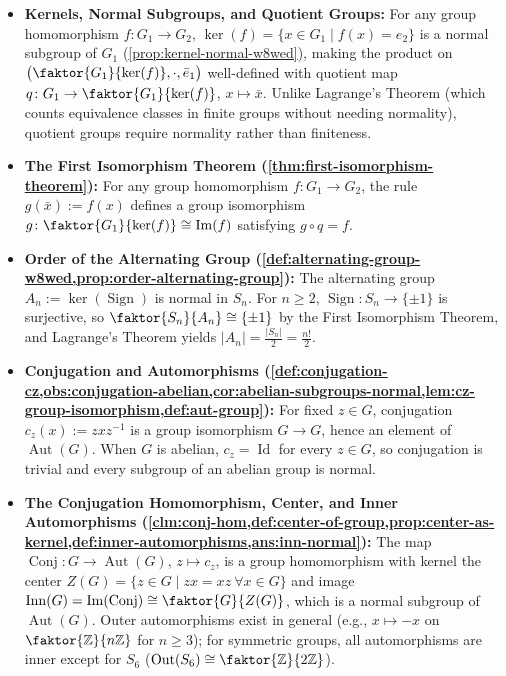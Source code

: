 \begin{overview}
\begin{itemize}
    \item \textbf{Kernels, Normal Subgroups, and Quotient Groups:} For any group homomorphism $f \colon G_1 \to G_2$, $\ker(f) = \{x \in G_1 \mid f(x) = e_2\}$ is a normal subgroup of $G_1$ (\cref{prop:kernel-normal-w8wed}), making the product on $\bigl(\faktor{G_1}{\ker(f)}, \cdot, \bar{e}_1\bigr)$ well-defined with quotient map $q \colon G_1 \to \faktor{G_1}{\ker(f)}$, $x \mapsto \bar{x}$. Unlike Lagrange's Theorem (which counts equivalence classes in finite groups without needing normality), quotient groups require normality rather than finiteness.
    \item \textbf{The First Isomorphism Theorem (\cref{thm:first-isomorphism-theorem}):} For any group homomorphism $f \colon G_1 \to G_2$, the rule $g(\bar{x}) := f(x)$ defines a group isomorphism $g \colon \faktor{G_1}{\ker(f)} \cong \operatorname{Im}(f)$ satisfying $g \circ q = f$.
    \item \textbf{Order of the Alternating Group (\cref{def:alternating-group-w8wed,prop:order-alternating-group}):} The alternating group $A_n := \ker(\operatorname{Sign})$ is normal in $S_n$. For $n \ge 2$, $\operatorname{Sign} \colon S_n \to \{\pm 1\}$ is surjective, so $\faktor{S_n}{A_n} \cong \{\pm 1\}$ by the First Isomorphism Theorem, and Lagrange's Theorem yields $|A_n| = \frac{|S_n|}{2} = \frac{n!}{2}$.
    \item \textbf{Conjugation and Automorphisms (\cref{def:conjugation-cz,obs:conjugation-abelian,cor:abelian-subgroups-normal,lem:cz-group-isomorphism,def:aut-group}):} For fixed $z \in G$, conjugation $c_z(x) := z x z^{-1}$ is a group isomorphism $G \to G$, hence an element of $\operatorname{Aut}(G)$. When $G$ is abelian, $c_z = \operatorname{Id}$ for every $z \in G$, so conjugation is trivial and every subgroup of an abelian group is normal.
    \item \textbf{The Conjugation Homomorphism, Center, and Inner Automorphisms (\cref{clm:conj-hom,def:center-of-group,prop:center-as-kernel,def:inner-automorphisms,ans:inn-normal}):} The map $\operatorname{Conj} \colon G \to \operatorname{Aut}(G)$, $z \mapsto c_z$, is a group homomorphism with kernel the center $Z(G) = \{z \in G \mid zx = xz \ \forall x \in G\}$ and image $\operatorname{Inn}(G) = \operatorname{Im}(\operatorname{Conj}) \cong \faktor{G}{Z(G)}$, which is a normal subgroup of $\operatorname{Aut}(G)$. Outer automorphisms exist in general (e.g., $x \mapsto -x$ on $\faktor{\mathbb{Z}}{n\mathbb{Z}}$ for $n \ge 3$); for symmetric groups, all automorphisms are inner except for $S_6$ ($\operatorname{Out}(S_6) \cong \faktor{\mathbb{Z}}{2\mathbb{Z}}$).

\end{itemize}
\end{overview}
